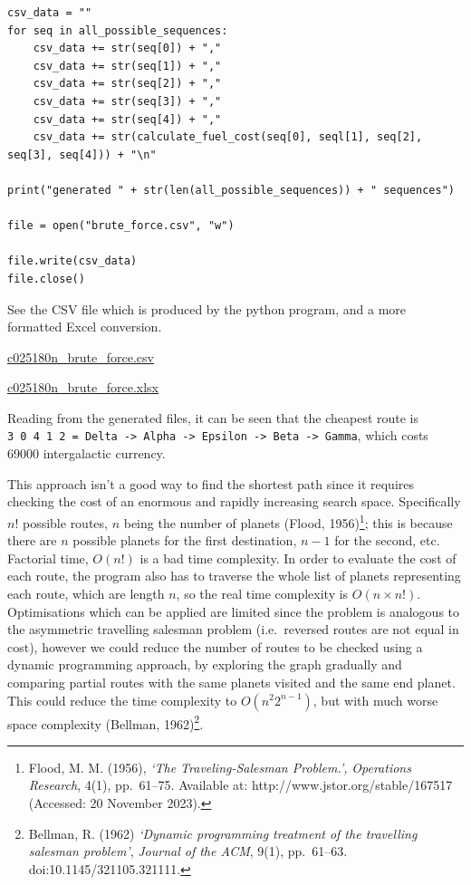 \documentclass[
]{article}
\begin{document}
\begin{verbatim}
csv_data = ""
for seq in all_possible_sequences:
    csv_data += str(seq[0]) + ","
    csv_data += str(seq[1]) + ","
    csv_data += str(seq[2]) + ","
    csv_data += str(seq[3]) + ","
    csv_data += str(seq[4]) + ","
    csv_data += str(calculate_fuel_cost(seq[0], seql[1], seq[2], seq[3], seq[4])) + "\n"

print("generated " + str(len(all_possible_sequences)) + " sequences")

file = open("brute_force.csv", "w")

file.write(csv_data)
file.close()
\end{verbatim}

See the CSV file which is produced by the python program, and a more
formatted Excel conversion.

\url{c025180n_brute_force.csv}

\url{c025180n_brute_force.xlsx}

Reading from the generated files, it can be seen that the cheapest route
is
\texttt{3\ 0\ 4\ 1\ 2\ =\ Delta\ -\textgreater{}\ Alpha\ -\textgreater{}\ Epsilon\ -\textgreater{}\ Beta\ -\textgreater{}\ Gamma},
which costs 69000 intergalactic currency.

This approach isn't a good way to find the shortest path since it
requires checking the cost of an enormous and rapidly increasing search
space. Specifically \(n!\) possible routes, \(n\) being the number of
planets (Flood, 1956)\footnote{Flood, M. M. (1956), \emph{`The
  Traveling-Salesman Problem.',} \emph{Operations Research}, 4(1),
  pp.~61--75. Available at: http://www.jstor.org/stable/167517
  (Accessed: 20 November 2023).}; this is because there are \(n\)
possible planets for the first destination, \(n-1\) for the second, etc.
Factorial time, \(O(n!)\) is a bad time complexity. In order to evaluate
the cost of each route, the program also has to traverse the whole list
of planets representing each route, which are length \(n\), so the real
time complexity is \(O(n\times n!)\). Optimisations which can be applied
are limited since the problem is analogous to the asymmetric travelling
salesman problem (i.e.~reversed routes are not equal in cost), however
we could reduce the number of routes to be checked using a dynamic
programming approach, by exploring the graph gradually and comparing
partial routes with the same planets visited and the same end planet.
This could reduce the time complexity to \(O(n^2 2^{n-1})\), but with
much worse space complexity (Bellman, 1962)\footnote{Bellman, R. (1962)
  \emph{`Dynamic programming treatment of the travelling salesman
  problem'}, \emph{Journal of the ACM}, 9(1), pp.~61--63.
  doi:10.1145/321105.321111.}.
\end{document}
